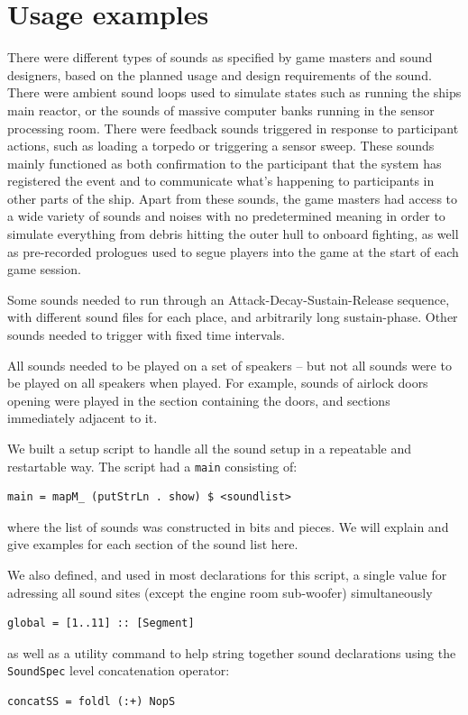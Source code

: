 \section{Usage examples}

There were different types of sounds as specified by game masters and sound designers, based on the planned usage and design requirements of the sound. There were ambient sound loops used to simulate states such as running the ships main reactor, or the sounds of massive computer banks running in the sensor processing room. There were feedback sounds triggered in response to participant actions, such as loading a torpedo or triggering a sensor sweep. These sounds mainly functioned as both confirmation to the participant that the system has registered the event and to communicate what's happening to participants in other parts of the ship. Apart from these sounds, the game masters had access to a wide variety of sounds and noises with no predetermined meaning in order to simulate everything from debris hitting the outer hull to onboard fighting, as well as pre-recorded prologues used to segue players into the game at the start of each game session.

Some sounds needed to run through an Attack-Decay-Sustain-Release sequence, with different sound files for each place, and arbitrarily long sustain-phase. Other sounds needed to trigger with fixed time intervals.

All sounds needed to be played on a set of speakers -- but not all sounds were to be played on all speakers when played. For example, sounds of airlock doors opening were played in the section containing the doors, and sections immediately adjacent to it. 

We built a setup script to handle all the sound setup in a repeatable and restartable way. The script had a \texttt{main} consisting of:
\begin{verbatim}
main = mapM_ (putStrLn . show) $ <soundlist>
\end{verbatim}
where the list of sounds was constructed in bits and pieces. We will explain and give examples for each section
of the sound list here.

We also defined, and used in most declarations for this script, a
single value for adressing all sound sites (except the engine room
sub-woofer) simultaneously
\begin{verbatim}
global = [1..11] :: [Segment] 
\end{verbatim}
as well as a utility command to help string together sound
declarations using the \texttt{SoundSpec} level concatenation
operator:
\begin{verbatim}
concatSS = foldl (:+) NopS
\end{verbatim}

